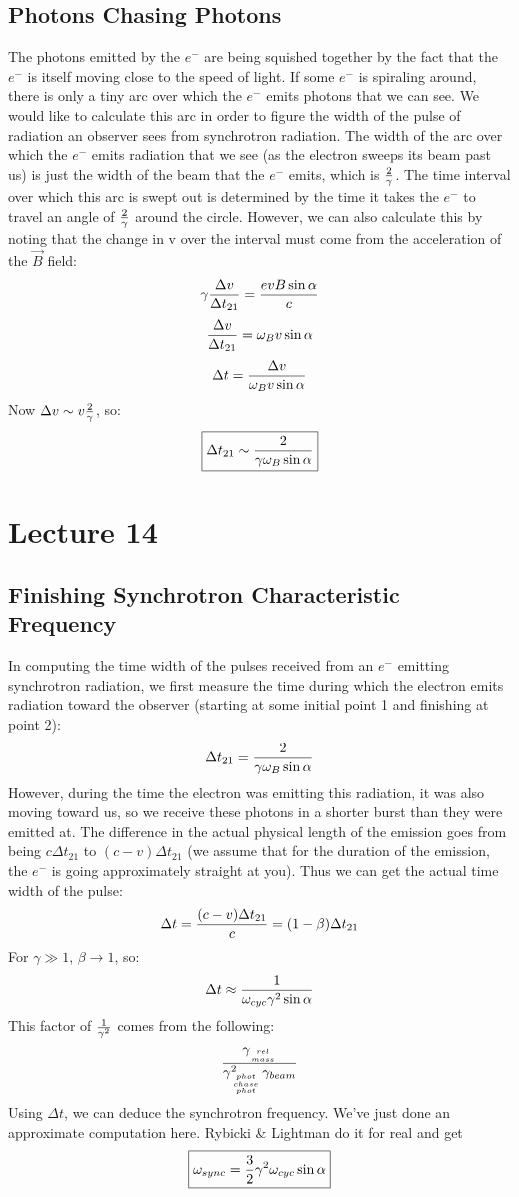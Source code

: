 \documentclass[11pt]{article}
\def\inv#1{{1 \over #1}}
\begin{document}
\subsection*{ Photons Chasing Photons}

The photons emitted by the $e^-$ are being squished together by the fact that
the $e^-$ is itself moving close to the speed of light.  If some $e^-$ is
spiraling around, there is only a tiny arc over which the $e^-$ emits
photons that we can see.  We would like to calculate this arc in order to
figure the width of the pulse of radiation an observer sees from synchrotron
radiation.  The width of the arc over which the $e^-$ emits radiation that
we see (as the electron sweeps its beam past us) is just the width of the
beam that the $e^-$ emits, which is $2\over\gamma$.  The time interval
over which this arc is swept out is determined by the time it takes the
$e^-$ to travel an angle of $2\over\gamma$ around the circle.  However, we can
also calculate this by noting that the change in v over the interval must
come from the acceleration of the $\vec B$ field:
$$\gamma{\Delta v\over\Delta t_{21}}={evB\sin\alpha\over c}$$
$${\Delta v\over\Delta t_{21}}=\omega_Bv\sin\alpha$$
$$\Delta t={\Delta v\over \omega_B v\sin\alpha}$$
Now $\Delta v\sim v{2\over\gamma}$, so:
$$\boxed{\Delta t_{21}\sim{2\over\gamma\omega_B\sin\alpha}}$$

\section*{ Lecture 14 }

\subsection*{ Finishing Synchrotron Characteristic Frequency}

In computing the time width of the pulses received from an $e^-$ emitting 
synchrotron radiation, we first measure the time during which the 
electron emits radiation toward the observer (starting at some initial
point 1 and finishing at point 2):
$$\Delta t_{21}={2\over\gamma\omega_B\sin\alpha}$$
However, during the time the electron was emitting this radiation, it was
also moving toward us, so we receive these photons in a shorter burst than
they were emitted at.  The difference in the actual physical length of
\def\tto{{t_{21}}}
the emission goes from being $c\Delta\tto$ to $(c-v)\Delta\tto$ (we assume
that for the duration of the emission, the $e^-$ is going approximately
straight at you).  Thus we can get the actual time width of the pulse:
$$\Delta t={(c-v)\Delta\tto\over c}=(1-\beta)\Delta\tto$$
For $\gamma\gg1$, $\beta\to1$, so:
$$\Delta t\approx\inv{\omega_{cyc}\gamma^2\sin\alpha}$$
This factor of $\inv{\gamma^2}$ comes from the following:
$${\gamma_{rel\atop mass}\over
\gamma_{{phot\atop chase}\atop phot}^2\gamma_{beam}}$$
Using $\Delta t$, we can deduce the synchrotron frequency.  We've just done 
an approximate computation here.  Rybicki \& Lightman do it
for real and get
$$\boxed{\omega_{sync}={3\over2}\gamma^2\omega_{cyc}\sin\alpha}$$
\end{document}
